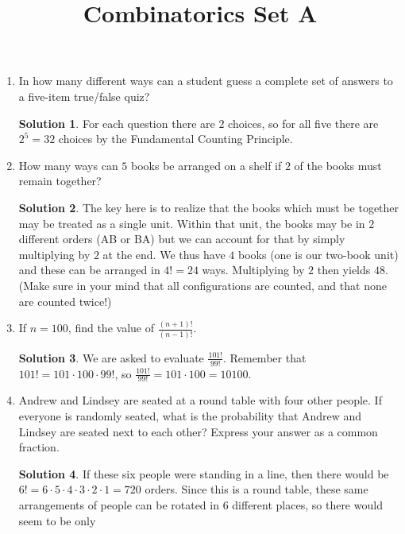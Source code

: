 \documentclass[twocolumn]{article}
\title{Combinatorics Set A}
\author{}
\date{}
\theoremstyle{definition}
\newtheorem*{solution}{Solution}
\begin{document}
\maketitle
\begin{enumerate}
    \item In how many different ways can a student guess a complete set of 
        answers to a five-item true/false quiz?
        \begin{solution}
            For each question there are $2$ choices, so for all five there are 
            $2^5 = 32$ choices by the Fundamental Counting Principle.
        \end{solution}
    \item How many ways can $5$ books be arranged on a shelf if $2$ of the books 
        must remain together?
        \begin{solution}
            The key here is to realize that the books which must be together may 
            be treated as a single unit. Within that unit, the books may be in 
            $2$ different orders (AB or BA) but we can account for that by 
            simply multiplying by $2$ at the end. We thus have $4$ books (one is 
            our two-book unit) and these can be arranged in $4! = 24$ ways.  
            Multiplying by $2$ then yields $48$. (Make sure in your mind that 
            all configurations are counted, and that none are counted twice!)
        \end{solution}
    \item If $n = 100$, find the value of $\frac{(n+1)!}{(n-1)!}$.
        \begin{solution}
            We are asked to evaluate $\frac{101!}{99!}$. Remember that $101! = 
            101 \cdot 100 \cdot 99!$, so $\frac{101!}{99!} = 101 \cdot 100 = 
            10100$.
        \end{solution}
    \item Andrew and Lindsey are seated at a round table with four other people.  
        If everyone is randomly seated, what is the probability that Andrew and 
        Lindsey are seated next to each other? Express your answer as a common 
        fraction.
        \begin{solution}
            If these six people were standing in a line, then there would be $6!  
            = 6 \cdot 5 \cdot 4 \cdot 3 \cdot 2 \cdot 1 = 720$ orders. Since 
            this is a round table, these same arrangements of people can be 
            rotated in $6$ different places, so there would seem to be only 

\end{solution}
\end{enumerate}
\end{document}
